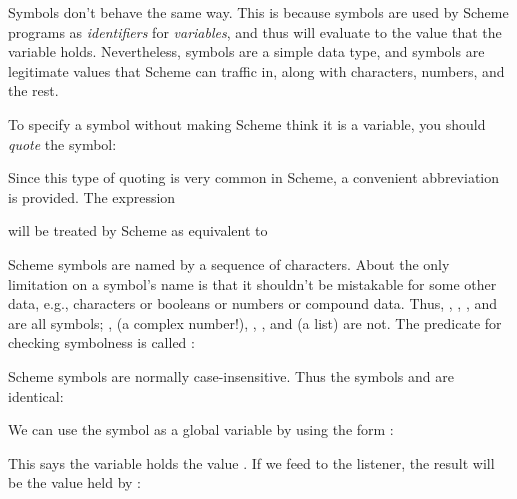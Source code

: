 {


\n Symbols don’t behave the same way.  This is because symbols
are used by Scheme programs as {\em identifiers} for {\em
variables}, and thus will evaluate to the value that the
variable holds.  Nevertheless, symbols are a simple data
type, and symbols are legitimate values that Scheme can
traffic in, along with characters, numbers, and the rest.


To specify a symbol without making Scheme think it is a
variable, you should {\em quote} the symbol:




Since this type of quoting is very common in Scheme, a
convenient abbreviation is provided.  The expression


\n will be treated by Scheme as equivalent to



\n Scheme symbols are named by a sequence of characters.  About
the only limitation on a symbol’s name is that it shouldn’t
be mistakable for some other data, e.g., characters or booleans
or numbers or compound data.  Thus, ,
,
\q{<=>}, and \q{$!#*} are all symbols; ,  (a
complex number!), %
, , and
 (a list) are not.    The predicate for
checking symbolness is called :



\n Scheme symbols are normally case-insensitive.  Thus the
symbols
 and  are identical:



\n We can use the symbol  as a global variable by using
the form :


\n This says the variable  holds the value .  If we
feed  to the listener, the result will be the value
held by :

}
